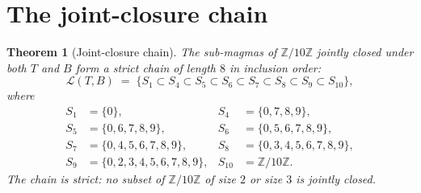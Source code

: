 \documentclass[11pt,reqno]{amsart}
\theoremstyle{plain}
\newtheorem{theorem}{Theorem}
\theoremstyle{definition}
\theoremstyle{remark}
\newcommand{\Z}{\mathbb{Z}}
\newcommand{\Zten}{\Z/10\Z}
\begin{document}
\section{The joint-closure chain}\label{sec:chain}

\begin{theorem}[Joint-closure chain]\label{thm:chain}
The sub-magmas of $\Zten$ jointly closed under both $T$ and $B$
form a strict chain of length $8$ in inclusion order:
\[
\mathcal{L}(T,B)\;=\;\bigl\{S_{1}\subset S_{4}\subset S_{5}\subset
S_{6}\subset S_{7}\subset S_{8}\subset S_{9}\subset S_{10}\bigr\},
\]
where
\begin{align*}
S_{1}&=\{0\}, & S_{4}&=\{0,7,8,9\}, \\
S_{5}&=\{0,6,7,8,9\}, & S_{6}&=\{0,5,6,7,8,9\}, \\
S_{7}&=\{0,4,5,6,7,8,9\}, & S_{8}&=\{0,3,4,5,6,7,8,9\}, \\
S_{9}&=\{0,2,3,4,5,6,7,8,9\}, & S_{10}&=\Zten.
\end{align*}
The chain is strict: no subset of $\Zten$ of size $2$ or size $3$
is jointly closed.
\end{theorem}
\end{document}

